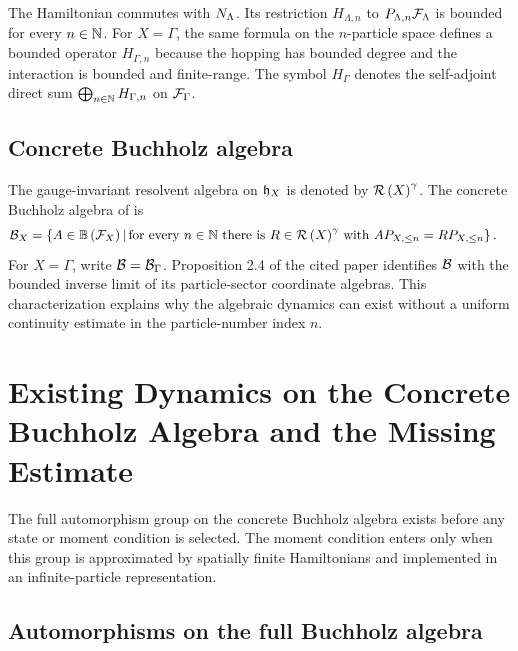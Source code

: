 \documentclass[11pt,a4paper]{article}
\theoremstyle{plain}
\theoremstyle{definition}
\theoremstyle{remark}
\begin{document}
The Hamiltonian commutes with \(\opfocknumber_{\Lambda}\). Its restriction \(H_{\Lambda,n}\) to \(P_{\Lambda,n}\sphilb{F}_{\Lambda}\) is bounded for every \(n \in \mathbb{N}\). For \(X = \Gamma\), the same formula on the \(n\)-particle space defines a bounded operator \(H_{\Gamma,n}\) because the hopping has bounded degree and the interaction is bounded and finite-range. The symbol \(H_{\Gamma}\) denotes the self-adjoint direct sum \(\bigoplus_{n\in\mathbb{N}}H_{\Gamma,n}\) on \(\sphilb{F}_{\Gamma}\).

\subsection{Concrete Buchholz algebra}\label{concrete-buchholz-algebra}

The gauge-invariant resolvent algebra on \(\sphilbfrak{h}_{X}\) is denoted by \(\mathcal{R} \left( X \right)^{\gamma}\). The concrete Buchholz algebra of \cite[Definition 2.2]{DeuchertLampartLemm001} is \[\begin{aligned}
\oa{B}_{X}
& =
\set{A \in \opspbddlin{\sphilb{F}_{X}}}
{\text{for every $n \in \monnat$ there is $R \in
\fun{\oaresolventalgebra}{X}^{\gamma}$ with $A P_{X,\leq n} = R P_{X,\leq n}$}}.
\end{aligned}\] For \(X = \Gamma\), write \(\mathcal{B} = \mathcal{B}_{\Gamma}\). Proposition 2.4 of the cited paper identifies \(\mathcal{B}\) with the bounded inverse limit of its particle-sector coordinate algebras. This characterization explains why the algebraic dynamics can exist without a uniform continuity estimate in the particle-number index \(n\).

\section{Existing Dynamics on the Concrete Buchholz Algebra and the Missing Estimate}\label{existing-dynamics-on-the-concrete-buchholz-algebra-and-the-missing-estimate}

The full automorphism group on the concrete Buchholz algebra exists before any state or moment condition is selected. The moment condition enters only when this group is approximated by spatially finite Hamiltonians and implemented in an infinite-particle representation.

\subsection{Automorphisms on the full Buchholz algebra}\label{automorphisms-on-the-full-buchholz-algebra}
\end{document}
